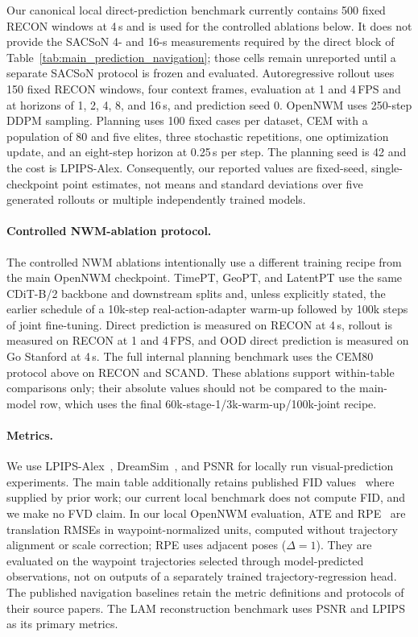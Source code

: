 Our canonical local direct-prediction benchmark currently contains 500 fixed
RECON windows at 4\,s and is used for the controlled ablations below.  It does
not provide the SACSoN 4- and 16-s measurements required by the direct block
of Table~\ref{tab:main_prediction_navigation}; those cells remain unreported
until a separate SACSoN protocol is frozen and evaluated.  Autoregressive
rollout uses 150 fixed RECON windows, four context frames, evaluation at 1 and
4\,FPS and at horizons of 1, 2, 4, 8, and 16\,s, and prediction seed 0.
OpenNWM uses 250-step DDPM sampling.  Planning uses 100 fixed cases per
dataset, CEM with a population of 80 and five elites, three stochastic
repetitions, one optimization update, and an eight-step horizon at 0.25\,s per
step.  The planning seed is 42 and the cost is LPIPS-Alex.  Consequently, our
reported values are fixed-seed, single-checkpoint point estimates, not means
and standard deviations over five generated rollouts or multiple independently
trained models.

\paragraph{Controlled NWM-ablation protocol.}
The controlled NWM ablations intentionally use a different training recipe
from the main OpenNWM checkpoint.  TimePT, GeoPT, and LatentPT use the same
CDiT-B/2 backbone and downstream splits and, unless explicitly stated, the
earlier schedule of a 10k-step real-action-adapter warm-up followed by 100k
steps of joint fine-tuning.  Direct prediction is measured on RECON at 4\,s,
rollout is measured on RECON at 1 and 4\,FPS, and OOD direct prediction is
measured on Go Stanford at 4\,s.  The full internal planning benchmark uses
the CEM80 protocol above on RECON and SCAND.  These ablations support
within-table comparisons only; their absolute values should not be compared
to the main-model row, which uses the final 60k-stage-1/3k-warm-up/100k-joint
recipe.

\paragraph{Metrics.}
We use LPIPS-Alex~\citep{zhang2018unreasonable},
DreamSim~\citep{fu2023dreamsim}, and PSNR for locally run visual-prediction
experiments.  The main table additionally retains published FID
values~\citep{heusel2017gans} where supplied by prior work; our current local
benchmark does not compute FID, and we make no FVD claim.  In our local
OpenNWM evaluation, ATE and RPE~\citep{sturm2012benchmark} are translation
RMSEs in waypoint-normalized units, computed without trajectory alignment or
scale correction; RPE uses adjacent poses ($\Delta=1$).  They are evaluated on
the waypoint trajectories selected through model-predicted observations, not
on outputs of a separately trained trajectory-regression head.  The published
navigation baselines retain the metric definitions and protocols of their
source papers.  The LAM reconstruction benchmark uses PSNR and LPIPS as its
primary metrics.

